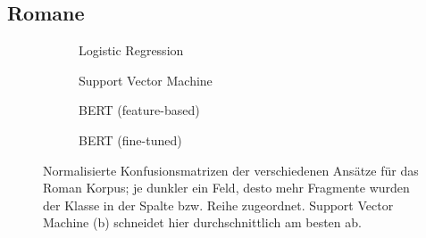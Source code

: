 \subsection{Romane}
\begin{figure}
\centering
\begin{subfigure}[b]{.45\linewidth}

\caption{Logistic Regression}\label{fig:romane-log}
\end{subfigure}
\begin{subfigure}[b]{.45\linewidth}

\caption{Support Vector Machine}\label{fig:romane-svm}
\end{subfigure}

\begin{subfigure}[b]{.45\linewidth}

\caption{BERT (feature-based)}\label{fig:romane-feat}
\end{subfigure}
\begin{subfigure}[b]{.45\linewidth}

\caption{BERT (fine-tuned)}\label{fig:romane-fine}
\end{subfigure}
\caption{Normalisierte Konfusionsmatrizen der verschiedenen Ansätze für das Roman Korpus; je dunkler ein Feld, desto mehr Fragmente wurden der Klasse in der Spalte bzw. Reihe zugeordnet. Support Vector Machine (b) schneidet hier durchschnittlich am besten ab.}
\label{fig:roman}
\end{figure}





